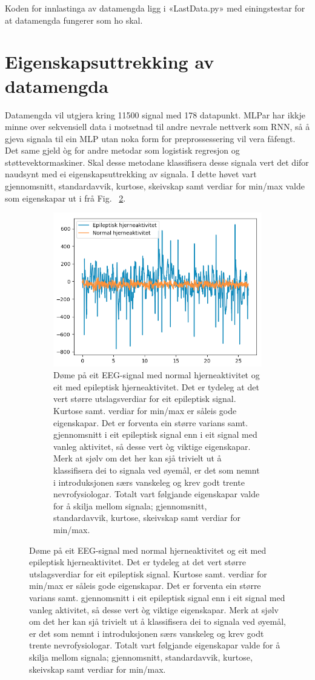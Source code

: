 \documentclass[oneside, nynorsk]{book}
\begin{document}
Koden for innlastinga av datamengda ligg i «LastData.py» med einingstestar for at datamengda fungerer som ho skal.
\newpage
\section*{Eigenskapsuttrekking av datamengda}
Datamengda vil utgjera kring 11500 signal med 178 datapunkt.
MLPar har ikkje minne over sekvensiell data i motsetnad til andre nevrale nettverk som RNN,
så å gjeva signala til ein MLP utan noka form for preprossessering vil vera fåfengt. Det same gjeld òg for andre metodar som logistisk regresjon og
støttevektormaskiner.
Skal desse metodane klassifisera desse signala vert det difor naudsynt med ei eigenskapsuttrekking av signala.
I dette høvet vart gjennomsnitt, standardavvik, kurtose, skeivskap samt verdiar for min/max valde som eigenskapar ut i frå Fig. ~\ref{Episignal}.

\begin{figure}[h!]
  \begin{subfigure}{\textwidth}
        \centering
        \centerline{\includegraphics[width=0.8\linewidth]{Signalsamanlikn}}
        \caption{Døme på eit EEG-signal med normal hjerneaktivitet og eit med epileptisk hjerneaktivitet.
        Det er tydeleg at det vert større utslagsverdiar for eit epileptisk signal. Kurtose samt. verdiar for min/max er såleis gode eigenskapar.
        Det er forventa ein større varians samt. gjennomsnitt i eit epileptisk signal
        enn i eit signal med vanleg aktivitet, så desse vert òg viktige eigenskapar.
        Merk at sjølv om det her kan sjå trivielt ut å klassifisera dei to signala ved øyemål, er det som nemnt i introduksjonen særs vanskeleg og krev godt trente nevrofysiologar.
        Totalt vart følgjande eigenskapar valde for å skilja mellom signala; gjennomsnitt, standardavvik, kurtose, skeivskap samt verdiar for min/max.}
        \label{Episignal}
    \end{subfigure}
\end{figure}
\end{document}
